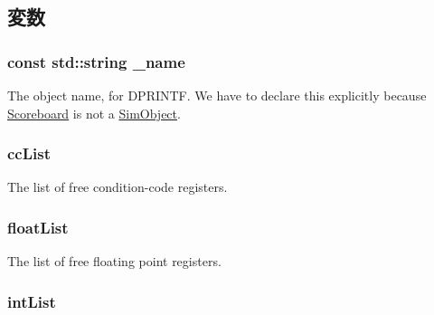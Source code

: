 \subsection{変数}
\hypertarget{classUnifiedFreeList_a1b003dc5cfce1a4d8f9a0c4b9b589045}{
\subsubsection[{\_\-name}]{\setlength{\rightskip}{0pt plus 5cm}const std::string {\bf \_\-name}}}
\label{classUnifiedFreeList_a1b003dc5cfce1a4d8f9a0c4b9b589045}
The object name, for DPRINTF. We have to declare this explicitly because \hyperlink{classScoreboard}{Scoreboard} is not a \hyperlink{classSimObject}{SimObject}. \hypertarget{classUnifiedFreeList_abaa0000cc485f09abf2d7877a5e0b41f}{
\subsubsection[{ccList}]{ {\bf ccList}}}
\label{classUnifiedFreeList_abaa0000cc485f09abf2d7877a5e0b41f}
The list of free condition-\/code registers. \hypertarget{classUnifiedFreeList_a84c2a7dcff56dcaa39aefc6e77acf461}{
\subsubsection[{floatList}]{ {\bf floatList}}}
\label{classUnifiedFreeList_a84c2a7dcff56dcaa39aefc6e77acf461}
The list of free floating point registers. \hypertarget{classUnifiedFreeList_aeafc736e9696de02d3195527f55b7470}{
\subsubsection[{intList}]{ {\bf intList}}}
